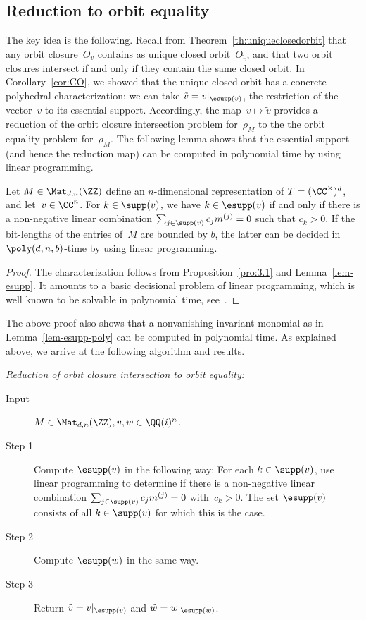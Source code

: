 %
\subsection{Reduction to orbit equality}
%

The key idea is the following.
Recall from Theorem~\ref{th:uniqueclosedorbit} that any orbit closure~$\overline{O_v}$ contains as unique closed orbit~$O_{\tilde v}$, and that two orbit closures intersect if and only if they contain the same closed orbit.
In Corollary~\ref{cor:CO}, we showed that the unique closed orbit has a concrete polyhedral characterization: we can take $\tilde v = v|_{\esupp(v)}$, the restriction of the vector~$v$ to its essential support.
Accordingly, the map~$v\mapsto \widetilde{v}$ provides a reduction of the orbit closure intersection problem for~$\rho_M$ to the the orbit equality problem for~$\rho_M$.
The following lemma shows that the essential support (and hence the reduction map) can be computed in polynomial time by using linear programming.

\begin{lemma}\label{lem-esupp-poly}
Let $M \in\Mat_{d,n}(\ZZ)$ define an $n$-dimensional representation of $T = (\CC^\times)^d$, and let~$v\in \CC^n$.
For $k\in\supp(v)$, we have $k \in \esupp(v)$ if and only if there is a non-negative linear combination $\sum_{j \in \supp(v)} c_j m^{(j)} = 0$ such that $c_k > 0$.
If the bit-lengths of the entries of~$M$ are bounded by $b$, the latter can be decided in $\poly(d,n,b)$-time by using linear programming.
\end{lemma}

\begin{proof}
The characterization follows from Proposition~\ref{pro:3.1} and Lemma~\ref{lem-esupp}.
It amounts to a basic decisional problem of linear programming, which is well known to be solvable in polynomial time,
see~\cite{GLS-book}.
\end{proof}

The above proof also shows that a nonvanishing invariant monomial as in Lemma~\ref{lem-esupp-poly} can be computed in polynomial time.
As explained above, we arrive at the following algorithm and results.

\begin{algorithm}\label{algo:oci-to-oe} \emph{Reduction of orbit closure intersection to orbit equality:}
\begin{description}
\item[Input] $M \in \Mat_{d,n}(\ZZ), v,w \in \QQ(i)^n$.
\item[Step 1] Compute $\esupp(v)$ in the following way:
For each $k\in\supp(v)$, use linear programming to determine if there is a non-negative linear combination $\sum_{j \in \supp(v)} c_j m^{(j)} = 0$ with~$c_k>0$.
The set $\esupp(v)$ consists of all $k\in\supp(v)$ for which this is the case.
\item[Step 2] Compute $\esupp(w)$ in the same way.
\item[Step 3] Return $\tilde v = v|_{\esupp(v)}$ and $\tilde w = w|_{\esupp(w)}$.
\end{description}
\end{algorithm}


